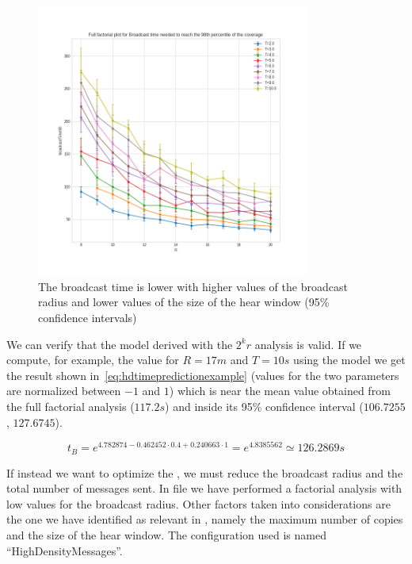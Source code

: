 \begin{figure}[hbt]
	\centering
	\includegraphics[width=0.8\textwidth]{img/hd/broadcasttime-R-ffplot}
	\caption{The broadcast time is lower with higher values of the broadcast
	radius and lower values of the size of the hear
	window (95\% confidence intervals)}\label{fig:hdtimeff}
\end{figure}

We can verify that the model derived with the \(2^{k}r\) analysis is valid. If we
compute, for example, the value for \(R\!=\!17m\) and \(T\!=\!10s\) using the
model we get the result shown in~\eqref{eq:hdtimepredictionexample} (values for
the two parameters are normalized between \(-1\) and \(1\)) which is near the
mean value obtained from the full factorial analysis (\(117.2s\)) and inside its
95\% confidence interval (\(106.7255\), \(127.6745\)).

\begin{equation}\label{eq:hdtimepredictionexample}
	t_B = e^{4.782874 - 0.462452 \cdot 0.4 + 0.240663 \cdot 1} =
	e^{4.8385562} \simeq 126.2869s
\end{equation}

If instead we want to optimize the , we must reduce
the broadcast radius and the total number of messages sent. In file
 we have performed a factorial analysis with low values for
the broadcast radius. Other factors taken into considerations are the one we
have identified as relevant in , namely the maximum number
of copies and the size of the hear window. The configuration used is named
``HighDensityMessages''.

